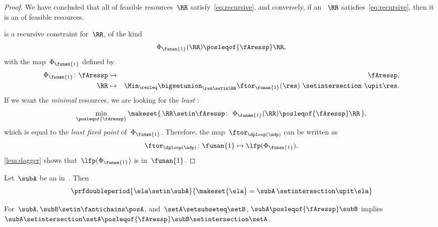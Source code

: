 \begin{proof}
    We have concluded that all  of feasible resources~$\RR$ satisfy~\cref{eq:recursive}, and conversely, if an ~$\RR$ satisfies~\cref{eq:recursive}, then it is an  of feasible resources.

     is a recursive constraint for~$\RR$, of the kind
    \begin{equation}
        \Phi_{\funan{1}}(\RR)\posleqof{\fAressp}\RR,
    \end{equation}
    with the map~$\Phi_{\funan{1}}$ defined by
    \begin{eqnarray}
        \Phi_{\funan{1}}\colon \fAressp & \to     & \fAressp,\label{eq:bigphi} \\
        \RR                             & \mapsto & \Min_{\resleq}\bigsetunion_{\res\setin\RR}\ftor_{\funan{1}}(\res)\ \setintersection\ \upit\res.\nonumber
    \end{eqnarray}
    If we want the \emph{minimal} resources, we are looking for the \emph{least} :
    \begin{equation}
        \min_{\posleqof{\fAressp}}\makeset{\,\RR\setin\fAressp\colon\ \Phi_{\funan{1}}(\RR)\posleqof{\fAressp}\RR\,},
    \end{equation}
    which is equal to the \emph{least fixed point} of~$\Phi_{\funan{1}}$.
    Therefore, the map~$\ftor_{\dploop(\adp)}$ can be written as
    \begin{equation}
        \ftor_{\dploop(\adp)}\colon\funan{1}\mapsto\lfp(\Phi_{\funan{1}}).
        \label{eq:loop_fixpoint}
    \end{equation}
    \cref{lem:dagger} shows that~$\lfp(\Phi_{\funan{1}})$ is  in~$\funan{1}$.
\end{proof}
\begin{lemma}
    \label{lem:antichain-write}
    Let~$\subA$ be an  in~\posA.
    Then
    \begin{equation}
        \prfdoubleperiod{
            \ela\setin \subA
        }{
            \makeset{\ela}=\subA\,\setintersection\upit \ela
        }
    \end{equation}
\end{lemma}

\begin{lemma}
    \label{lem:antichain_inter}
    For~$\subA,\subB\setin\fantichains\posA$, and~$\setA \setsubseteq \setB$,
    $\subA\posleqof{\fAressp}\subB$ implies~$\subA \setintersection \setA \posleqof{\fAressp}\subB\setintersection \setA$.
\end{lemma}

